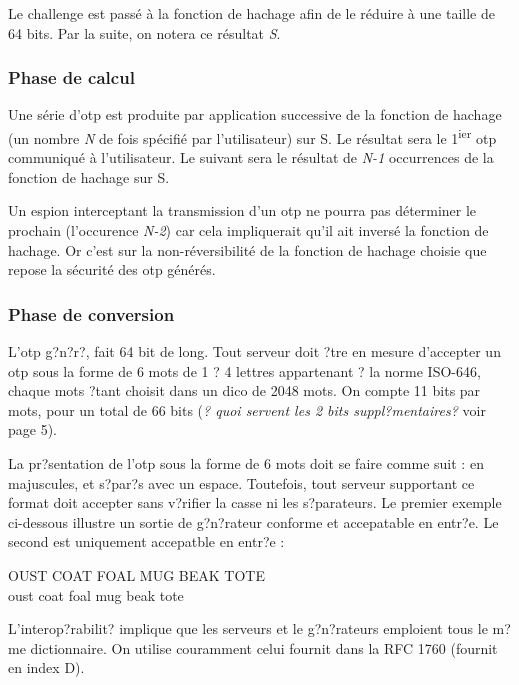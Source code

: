 \documentclass{../res/univ-projet}
\begin{document}
      Le challenge est passé à la fonction de hachage afin de le réduire à une taille de 64 bits. Par la suite, on notera ce résultat \emph{S}.

    \subsubsection{Phase de calcul}
      Une série d'otp est produite par application successive de la fonction de hachage (un nombre \emph{N} de fois spécifié par l'utilisateur) sur S. Le résultat sera le 1\textsuperscript{ier} otp communiqué à l'utilisateur. Le suivant sera le résultat de \emph{N-1} occurrences de la fonction de hachage sur S. 

      Un espion interceptant la transmission d'un otp ne pourra pas déterminer le prochain (l'occurence \emph{N-2}) car cela impliquerait qu'il ait inversé la fonction de hachage. Or c'est sur la non-réversibilité de la fonction de hachage choisie que repose la sécurité des otp générés.\\



    \subsubsection{Phase de conversion}
        L'otp g?n?r?, fait 64 bit de long. Tout serveur doit ?tre en mesure d'accepter un otp sous la forme de 6 mots de 1 ? 4 lettres appartenant ? la norme ISO-646, chaque mots ?tant choisit dans un dico de 2048 mots. On compte 11 bits par mots, pour un total de 66 bits (\emph{? quoi servent les 2 bits suppl?mentaires?} voir page 5).

        La pr?sentation de l'otp sous la forme de 6 mots doit se faire comme suit : en majuscules, et s?par?s avec un espace. Toutefois, tout serveur supportant ce format doit accepter sans v?rifier la casse ni les s?parateurs. Le premier exemple ci-dessous illustre un sortie de g?n?rateur conforme et accepatable en entr?e. Le second est uniquement accepatble en entr?e :
        \begin{center}
            OUST COAT FOAL MUG BEAK TOTE\\
            oust coat foal mug beak tote
        \end{center}

        L'interop?rabilit? implique que les serveurs et le g?n?rateurs emploient tous le m?me dictionnaire. On utilise couramment celui fournit dans la RFC 1760 (fournit en index D).
\end{document}
